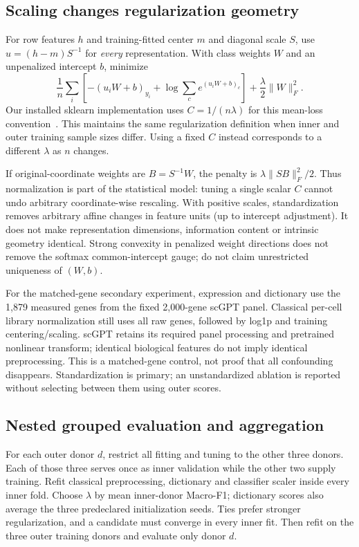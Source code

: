 \subsection{Scaling changes regularization geometry}
For row features $h$ and training-fitted center $m$ and diagonal scale $S$, use $u=(h-m)S^{-1}$ for \emph{every} representation. With class weights $W$ and an unpenalized intercept $b$, minimize
\[
 \frac1n\sum_i\left[-(u_iW+b)_{y_i}+\log\sum_c e^{(u_iW+b)_c}\right]
 +\frac\lambda2\|W\|_F^2.
\]
Our installed sklearn implementation uses $C=1/(n\lambda)$ for this mean-loss convention~\cite{sklearn}. This maintains the same regularization definition when inner and outer training sample sizes differ. Using a fixed $C$ instead corresponds to a different $\lambda$ as $n$ changes.

If original-coordinate weights are $B=S^{-1}W$, the penalty is $\lambda\|SB\|_F^2/2$. Thus normalization is part of the statistical model: tuning a single scalar $C$ cannot undo arbitrary coordinate-wise rescaling. With positive scales, standardization removes arbitrary affine changes in feature units (up to intercept adjustment). It does not make representation dimensions, information content or intrinsic geometry identical. Strong convexity in penalized weight directions does not remove the softmax common-intercept gauge; do not claim unrestricted uniqueness of $(W,b)$.

For the matched-gene secondary experiment, expression and dictionary use the 1,879 measured genes from the fixed 2,000-gene scGPT panel. Classical per-cell library normalization still uses all raw genes, followed by log1p and training centering/scaling. scGPT retains its required panel processing and pretrained nonlinear transform; identical biological features do not imply identical preprocessing. This is a matched-gene control, not proof that all confounding disappears. Standardization is primary; an unstandardized ablation is reported without selecting between them using outer scores.

\subsection{Nested grouped evaluation and aggregation}
For each outer donor $d$, restrict all fitting and tuning to the other three donors. Each of those three serves once as inner validation while the other two supply training. Refit classical preprocessing, dictionary and classifier scaler inside every inner fold. Choose $\lambda$ by mean inner-donor Macro-F1; dictionary scores also average the three predeclared initialization seeds. Ties prefer stronger regularization, and a candidate must converge in every inner fit. Then refit on the three outer training donors and evaluate only donor $d$.

